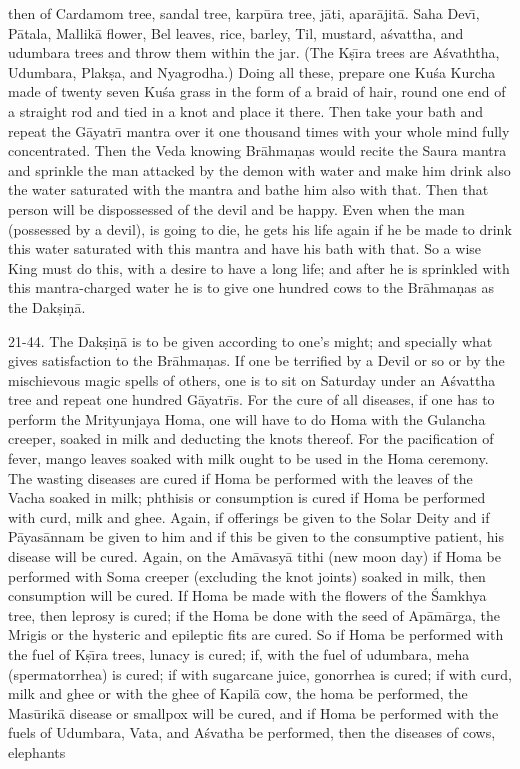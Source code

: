 then of Cardamom tree, sandal tree, karp\=ura tree, j\=ati, apar\=ajit\=a. Saha Dev\={\i}, P\=atala, Mallik\=a flower, Bel leaves, rice, barley, Til, mustard, a\'svattha, and udumbara trees and throw them within the jar. (The K\d{s}\={\i}ra trees are A\'svaththa, Udumbara, Plak\d{s}a, and Nyagrodha.) Doing all these, prepare one Ku\'sa Kurcha made of twenty seven Ku\'sa grass in the form of a braid of hair, round one end of a straight rod and tied in a knot and place it there. Then take your bath and repeat the G\=ayatr\={\i} mantra over it one thousand times with your whole mind fully concentrated. Then the Veda knowing Br\=ahma\d{n}as would recite the Saura mantra and sprinkle the man attacked by the demon with water and make him drink also the water saturated with the mantra and bathe him also with that. Then that person will be dispossessed of the devil and be happy. Even when the man (possessed by a devil), is going to die, he gets his life again if he be made to drink this water saturated with this mantra and have his bath with that. So a wise King must do this, with a desire to have a long life; and after he is sprinkled with this mantra-charged water he is to give one hundred cows to the Br\=ahma\d{n}as as the Dak\d{s}i\d{n}\=a.

21-44. The Dak\d{s}i\d{n}\=a is to be given according to one's might; and specially what gives satisfaction to the Br\=ahma\d{n}as. If one be terrified by a Devil or so or by the mischievous magic spells of others, one is to sit on Saturday under an A\'svattha tree and repeat one hundred G\=ayatr\={\i}s. For the cure of all diseases, if one has to perform the Mrityunjaya Homa, one will have to do Homa with the Gulancha creeper, soaked in milk and deducting the knots thereof. For the pacification of fever, mango leaves soaked with milk ought to be used in the Homa ceremony. The wasting diseases are cured if Homa be performed with the leaves of the Vacha soaked in milk; phthisis or consumption is cured if Homa be performed with curd, milk and ghee. Again, if offerings be given to the Solar Deity and if P\=ayas\=annam be given to him and if this be given to the consumptive patient, his disease will be cured. Again, on the Am\=avasy\=a tithi (new moon day) if Homa be performed with Soma creeper (excluding the knot joints) soaked in milk, then consumption will be cured. If Homa be made with the flowers of the \'Samkhya tree, then leprosy is cured; if the Homa be done with the seed of Ap\=am\=arga, the Mrigis or the hysteric and epileptic fits are cured. So if Homa be performed with the fuel of K\d{s}\={\i}ra trees, lunacy is cured; if, with the fuel of udumbara, meha (spermatorrhea) is cured; if with sugarcane juice, gonorrhea is cured; if with curd, milk and ghee or with the ghee of Kapil\=a cow, the homa be performed, the Mas\=urik\=a disease or smallpox will be cured, and if Homa be performed with the fuels of Udumbara, Vata, and A\'svatha be performed, then the diseases of cows, elephants

